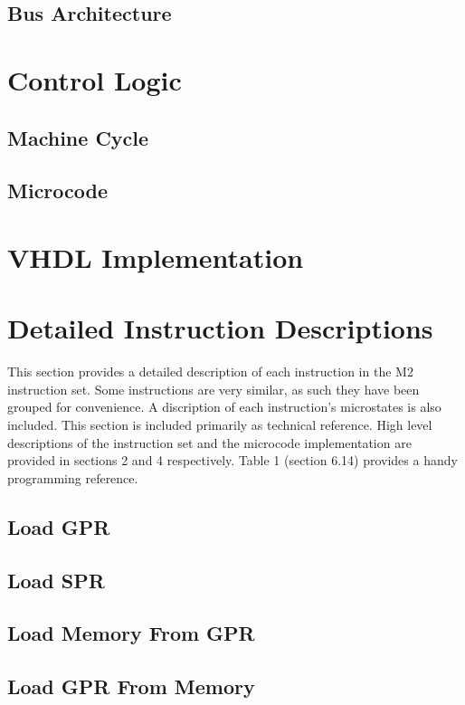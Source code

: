 \documentclass[a4paper,12pt]{article}
\newcommand{\mi}{M2 instruction set}
\begin{document}
\newpage
\subsection{Bus Architecture}

\newpage
\section{Control Logic}
\subsection{Machine Cycle}
\subsection{Microcode}

\newpage
\section{VHDL Implementation}

\newpage

\section{Detailed Instruction Descriptions}
This section provides a detailed description of each instruction in the \mi{}.
Some instructions are very similar, as such they have been grouped for 
convenience. A discription of each instruction's microstates is also included.
This section is included primarily as technical reference. High level 
descriptions of the instruction set and the microcode implementation are provided
in sections 2 and 4 respectively. Table 1 (section 6.14) provides a handy 
programming reference.
\par
\subsection{Load GPR}
\subsection{Load SPR}
\subsection{Load Memory From GPR}
\subsection{Load GPR From Memory}
\end{document}
